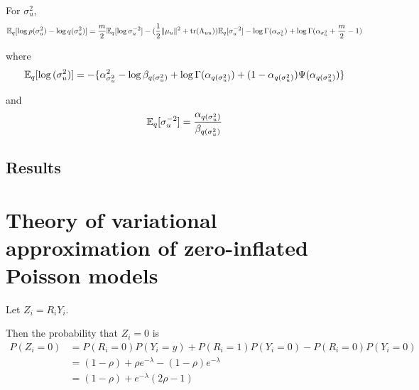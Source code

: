 \documentclass{amsart}
\begin{document}
For $\sigma^2_u$,
$$
{\mathbb E}_q [\log{p(\sigma_u^2)} - \log{q(\sigma_u^2)}] = \frac{m}{2} {\mathbb E}_q [\log{\sigma_u^{-2}}] - ({\frac{1}{2}} \|\mu_u\|^2 + \text{tr}(\Lambda_{uu})) {\mathbb E}_q [\sigma_u^{-2}] - \log{\Gamma(\alpha_{\sigma_u^2})} + \log{\Gamma(\alpha_{\sigma_u^2} + \frac{m}{2} - 1)}
$$

where
$$
{\mathbb E}_q[\log{(\sigma_u^2)}] = - \{\alpha_{\sigma_u^2}^2 - \log{\beta_{q(\sigma_u^2)}} + \log{\Gamma(\alpha_{q(\sigma_u^2)})} + (1-\alpha_{q(\sigma_u^2)})\Psi{(\alpha_{q(\sigma_u^2)})}\}
$$

and
$$
{\mathbb E}_q[\sigma_u^{-2}] = \frac{\alpha_{q(\sigma_u^2)}}{\beta_{q(\sigma_u^2)}}
$$

\subsection{Results}

\section{Theory of variational approximation of zero-inflated Poisson models}
Let $Z_i = R_i Y_i$.

Then the probability that $Z_i = 0$ is
$$
\begin{array}{ll}
P(Z_i = 0) &= P(R_i = 0)P(Y_i = y) + P(R_i = 1) P(Y_i = 0) - P(R_i = 0) P(Y_i = 0) \\
&= (1 - \rho) + \rho e^{-\lambda} - (1 - \rho) e^{-\lambda} \\
&= (1 - \rho) + e^{-\lambda}(2 \rho - 1)
\end{array}
$$



\end{document}
